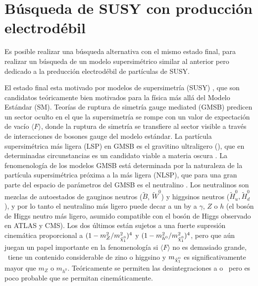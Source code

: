 \chapter{Búsqueda de SUSY con producción electrodébil}



Es posible realizar una búsqueda alternativa con el mismo estado final, para realizar un búsqueda de un modelo supersimétrico similar al anterior pero dedicado a la preducción electrodébil de partículas de SUSY.

El estado final esta motivado por modelos de supersimetría (SUSY) \cite{Golfand: 1971iw, Volkov: 1973ix, Wess: 1974tw, Wess: 1974jb, Ferrara: 1974pu, Salam: 1974ig, Martin: 1997ns}, que son candidatos teóricamente bien motivados para la física más allá del Modelo Estándar (SM). Teorías de ruptura de simetría gauge mediated (GMSB) \cite{Dine: 1981gu, AlvarezGaume: 1981wy, Nappi: 1982hm} predicen un sector oculto en el que la supersimetría se rompe con un valor de expectación de vacío $ \langle F \rangle $, donde la ruptura de simetría se transfiere al sector visible a través de interacciones de bosones gauge del modelo estándar. La partícula supersimétrica más ligera (LSP) en GMSB es el gravitino ultraligero (\gravino), que en determinadas circunstancias es un candidato viable a materia oscura \cite{Goldberg: 1983nd, Ellis: 1983ew}. La fenomenología de los modelos GMSB está determinada por la naturaleza de la partícula supersimétrica próxima a la más ligera (NLSP), que para una gran parte del espacio de parámetros del GMSB es el neutralino \ninoone. Los neutralinos son mezclas de autoestados de gauginos neutros ($\tilde{B}$, $\tilde{W}^{0}$) y higgsinos neutros ($\tilde{H}^{0}_{u},\tilde{H}^{0}_{d}$), y por lo tanto el neutralino más ligero puede decar a un \gravino by a $\gamma$, $Z$ o $h$ (el bosón de Higgs neutro más ligero, asumido compatible con el bosón de Higgs observado en ATLAS y CMS). Los dos últimos están sujetos a una fuerte supresión cinemática proporcional a $ (1-m_{Z}^{2}/m_{\ninoone}^{2})^4$ y $(1-m_{h^{0}}^{2}/m_{\ninoone}^{2})^4$, pero que aún juegan un papel importante en la fenomenología si $ \langle F \rangle $ no es demasiado grande, \ninoone\ tiene un contenido considerable de zino o higgsino y $m_{\ninoone}$ es significativamente mayor que $m_{Z}$ o $m_{h^{0}} $. Teóricamente se permiten las desintegraciones a \Azero o \Hzero \, pero es poco probable que se permitan cinemáticamente.


